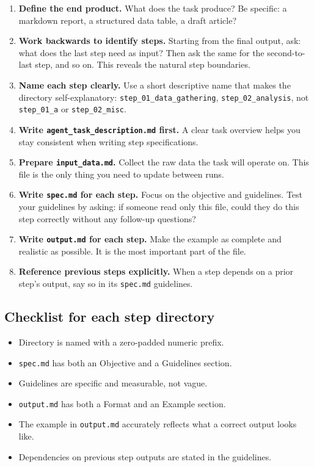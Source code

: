 \documentclass[12pt, a4paper]{article}
\begin{document}
\begin{enumerate}[leftmargin=1.5em]
  \item \textbf{Define the end product.} What does the task produce? Be specific: a markdown report, a structured data table, a draft article?

  \item \textbf{Work backwards to identify steps.} Starting from the final output, ask: what does the last step need as input? Then ask the same for the second-to-last step, and so on. This reveals the natural step boundaries.

  \item \textbf{Name each step clearly.} Use a short descriptive name that makes the directory self-explanatory: \texttt{step\_01\_data\_gathering}, \texttt{step\_02\_analysis}, not \texttt{step\_01\_a} or \texttt{step\_02\_misc}.

  \item \textbf{Write \texttt{agent\_task\_description.md} first.} A clear task overview helps you stay consistent when writing step specifications.

  \item \textbf{Prepare \texttt{input\_data.md}.} Collect the raw data the task will operate on. This file is the only thing you need to update between runs.

  \item \textbf{Write \texttt{spec.md} for each step.} Focus on the objective and guidelines. Test your guidelines by asking: if someone read only this file, could they do this step correctly without any follow-up questions?

  \item \textbf{Write \texttt{output.md} for each step.} Make the example as complete and realistic as possible. It is the most important part of the file.

  \item \textbf{Reference previous steps explicitly.} When a step depends on a prior step's output, say so in its \texttt{spec.md} guidelines.
\end{enumerate}

\subsection{Checklist for each step directory}

\begin{itemize}[leftmargin=1.5em]
  \item Directory is named with a zero-padded numeric prefix.
  \item \texttt{spec.md} has both an Objective and a Guidelines section.
  \item Guidelines are specific and measurable, not vague.
  \item \texttt{output.md} has both a Format and an Example section.
  \item The example in \texttt{output.md} accurately reflects what a correct output looks like.
  \item Dependencies on previous step outputs are stated in the guidelines.
\end{itemize}
\end{document}
